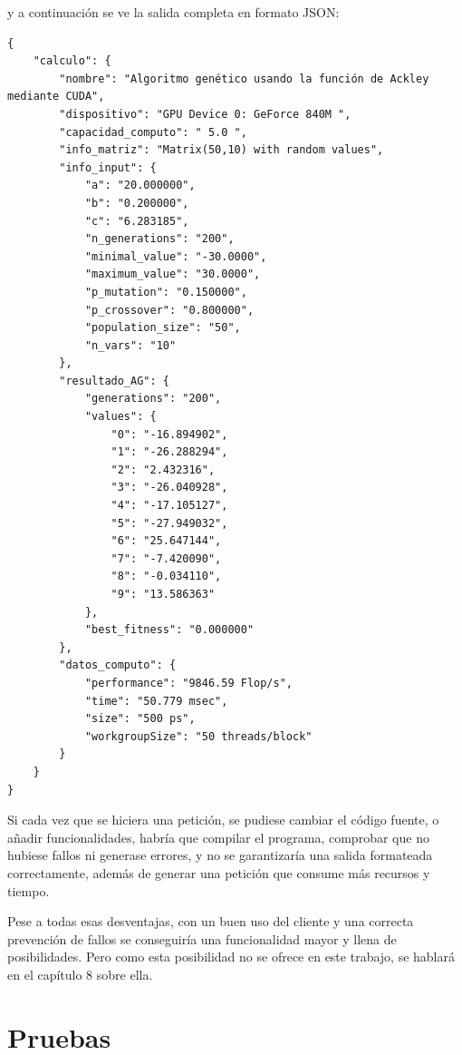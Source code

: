 \bigskip
y a continuación se ve la salida completa en formato JSON:

\begin{lstlisting}
{
	"calculo": {
		"nombre": "Algoritmo genético usando la función de Ackley mediante CUDA",
		"dispositivo": "GPU Device 0: GeForce 840M ",
		"capacidad_computo": " 5.0 ",
		"info_matriz": "Matrix(50,10) with random values",
		"info_input": {
			"a": "20.000000",
			"b": "0.200000",
			"c": "6.283185",
			"n_generations": "200",
			"minimal_value": "-30.0000",
			"maximum_value": "30.0000",
			"p_mutation": "0.150000",
			"p_crossover": "0.800000",
			"population_size": "50",
			"n_vars": "10"
		},
		"resultado_AG": {
			"generations": "200",
			"values": {
				"0": "-16.894902",
				"1": "-26.288294",
				"2": "2.432316",
				"3": "-26.040928",
				"4": "-17.105127",
				"5": "-27.949032",
				"6": "25.647144",
				"7": "-7.420090",
				"8": "-0.034110",
				"9": "13.586363"
			},
			"best_fitness": "0.000000"
		},
		"datos_computo": {
			"performance": "9846.59 Flop/s",
			"time": "50.779 msec",
			"size": "500 ps",
			"workgroupSize": "50 threads/block"
		}
	}
}
\end{lstlisting}


\bigskip
Si cada vez que se hiciera una petición, se pudiese cambiar el código fuente, o añadir funcionalidades, habría que compilar el programa, comprobar que no hubiese fallos ni generase errores, y no se garantizaría una salida formateada correctamente, además de generar una petición que consume más recursos y tiempo.

\bigskip
Pese a todas esas desventajas, con un buen uso del cliente y una correcta prevención de fallos se conseguiría una funcionalidad mayor y llena de posibilidades. Pero como esta posibilidad no se ofrece en este trabajo, se hablará en el capítulo 8 sobre ella.


\newpage
\section{Pruebas}



